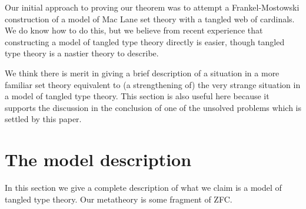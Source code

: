 \documentclass[112pt]{article}
\begin{document}
Our initial approach to proving our theorem was to attempt a Frankel-Mostowski construction of a model of Mac Lane set theory with a tangled web of cardinals.  We do know how to do this, but we believe from recent experience that constructing a model of tangled type theory directly is easier, though tangled type theory is a nastier theory to describe.

We think there is merit in giving a brief description of a situation in a more familiar set theory equivalent to (a strengthening of) the very strange situation in a model of tangled type theory.  This section is also useful here because it supports the discussion in the conclusion of one of the unsolved problems which is settled by this paper.

\newpage




\section{The model description}


In this section we give a complete description of what we claim is a model of tangled type theory.  Our metatheory is some fragment of ZFC.
\end{document}
